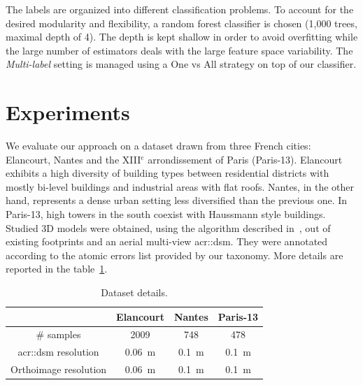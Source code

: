 \documentclass[conference]{IEEEtran}
\begin{document}
The labels are organized into different classification problems. To account for the desired modularity and flexibility, a random forest classifier is chosen (1,000 trees, maximal depth of 4). The depth is kept shallow in order to avoid overfitting while the large number of estimators deals with the large feature space variability. The \textit{Multi-label} setting is managed using a One vs All strategy on top of our classifier.

\section{Experiments}
\label{sec:expe}

We evaluate our approach on a dataset drawn from three French cities: Elancourt, Nantes and the XIII$^e$ arrondissement of Paris (Paris-13). Elancourt exhibits a high diversity of building types between residential districts with mostly bi-level buildings and  industrial areas with flat roofs. Nantes, in the other hand, represents a dense urban setting less diversified than the previous one. In Paris-13, high towers in the south coexist with Haussmann style buildings. Studied 3D models were obtained, using the algorithm described in~\cite{Durupt2006}, out of existing footprints and an aerial multi-view \acrshort{acr::dsm}. They were annotated according to the atomic errors list provided by our taxonomy. More details are reported in the table~\ref{tab::dataset}.

\begin{table}
	\begin{center}
		\scriptsize
        \begin{tabular}{c c c c}
            \toprule
            & Elancourt & Nantes & Paris-13 \\
            \midrule
            \# samples & 2009 & 748 & 478 \\
            \acrshort{acr::dsm} resolution & \SI{0.06}{\m} & \SI{0.1}{\m} & \SI{0.1}{\m} \\
            Orthoimage resolution & \SI{0.06}{\m} & \SI{0.1}{\m} & \SI{0.1}{\m} \\
            \bottomrule
        \end{tabular}
        \vspace{-.5cm}
        \caption{\label{tab::dataset} Dataset details.}
	\end{center}
\end{table}
\end{document}

